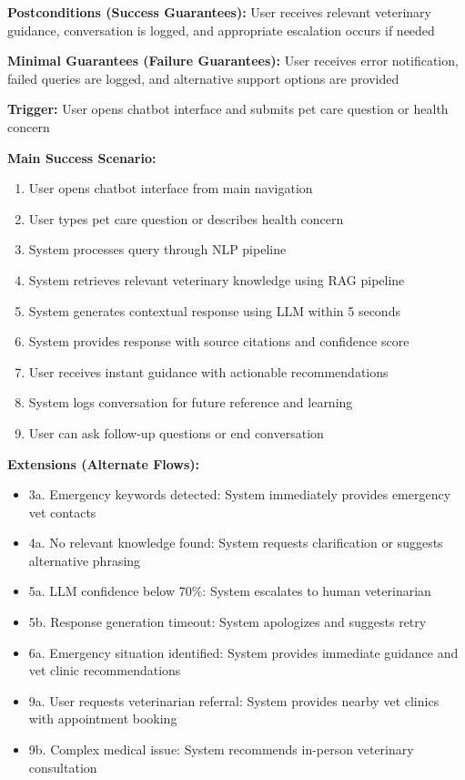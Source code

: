 \textbf{Postconditions (Success Guarantees):} User receives relevant veterinary guidance, conversation is logged, and appropriate escalation occurs if needed

\textbf{Minimal Guarantees (Failure Guarantees):} User receives error notification, failed queries are logged, and alternative support options are provided

\textbf{Trigger:} User opens chatbot interface and submits pet care question or health concern

\textbf{Main Success Scenario:}
\begin{enumerate}
    \item User opens chatbot interface from main navigation
    \item User types pet care question or describes health concern
    \item System processes query through NLP pipeline
    \item System retrieves relevant veterinary knowledge using RAG pipeline
    \item System generates contextual response using LLM within 5 seconds
    \item System provides response with source citations and confidence score
    \item User receives instant guidance with actionable recommendations
    \item System logs conversation for future reference and learning
    \item User can ask follow-up questions or end conversation
\end{enumerate}

\textbf{Extensions (Alternate Flows):}
\begin{itemize}
    \item 3a. Emergency keywords detected: System immediately provides emergency vet contacts
    \item 4a. No relevant knowledge found: System requests clarification or suggests alternative phrasing
    \item 5a. LLM confidence below 70\%: System escalates to human veterinarian
    \item 5b. Response generation timeout: System apologizes and suggests retry
    \item 6a. Emergency situation identified: System provides immediate guidance and vet clinic recommendations
    \item 9a. User requests veterinarian referral: System provides nearby vet clinics with appointment booking
    \item 9b. Complex medical issue: System recommends in-person veterinary consultation
\end{itemize}

